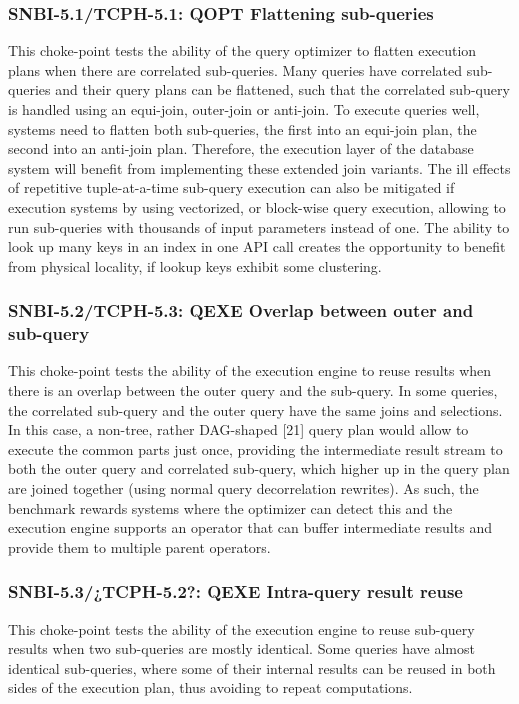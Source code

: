 \subsubsection{SNBI-5.1/TCPH-5.1: QOPT Flattening sub-queries}
\label{choke_point_5.1}
This choke-point tests the ability of the query optimizer to flatten execution plans when there are correlated sub-queries. Many queries have correlated sub-queries and their query plans can be flattened, 
such that the correlated sub-query is handled using an equi-join, outer-join or anti-join. To execute queries well, systems need to flatten both sub-queries, the first into an equi-join plan, the second into an anti-join plan. 
Therefore, the execution layer of the database system will benefit from implementing these extended join variants. 
The ill effects of repetitive tuple-at-a-time sub-query execution can also be mitigated if execution systems by using vectorized, or block-wise query execution, allowing to run sub-queries with thousands of input parameters instead of one. 
The ability to look up many keys in an index in one API call creates the opportunity to benefit from physical locality, if lookup keys exhibit some clustering.

\subsubsection{SNBI-5.2/TCPH-5.3: QEXE Overlap between outer and sub-query}
\label{choke_point_5.2}
This choke-point tests the ability of the execution engine to reuse results when there is an overlap between the outer query and the sub-query. In some queries, the correlated sub-query and the outer query have the same joins and selections. 
In this case, a non-tree, rather DAG-shaped [21] query plan would allow to execute the common parts just once, providing the intermediate result stream to both the outer query and correlated sub-query, 
which higher up in the query plan are joined together (using normal query decorrelation rewrites). 
As such, the benchmark rewards systems where the optimizer can detect this and the execution engine supports an operator that can buffer intermediate results and provide them to multiple parent operators.

\subsubsection{SNBI-5.3/¿TCPH-5.2?: QEXE Intra-query result reuse}
\label{choke_point_5.3}
This choke-point tests the ability of the execution engine to reuse sub-query results when two sub-queries are mostly identical. 
Some queries have almost identical sub-queries, where some of their internal results can be reused in both sides of the execution plan, thus avoiding to repeat computations.

